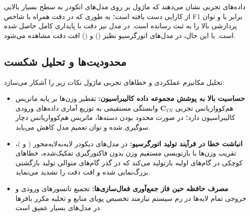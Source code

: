 داده‌های تجربی نشان می‌دهند که ماژول بر روی مدل‌های انکودر به سطح بسیار بالایی از کارایی دست یافته است؛ به طوری که در  دقت  همراه با شاخص F1 برابر با  و توان پردازشی بالا  را به ثبت رسانده است. در مدل  نیز دقت  با پایداری کامل حاصل شده است. با این حال، در مدل‌های اتورگرسیو نظیر  () و  () افت دقت مشاهده می‌شود.

\subsection{محدودیت‌ها و تحلیل شکست}
تحلیل مکانیزم عملکردی و خطاهای تجربی ماژول نکات زیر را آشکار می‌سازد:
\begin{itemize}
    \item \textbf{حساسیت بالا به پوشش مجموعه داده کالیبراسیون:} تقطیر وزن‌ها بر پایه ماتریس هم‌کوواریانس تجربی $\mathbf{C}_{YX}$ وابستگی مستقیمی به توزیع آماری داده‌های ورودی کالیبراسیون دارد؛ در صورت محدود بودن دسته‌ها، ماتریس هم‌کوواریانس دچار سوگیری شده و توان تعمیم مدل کاهش می‌یابد.
    \item \textbf{انباشت خطا در فرآیند تولید اتورگرسیو:} در مدل‌های دیکودر لایه‌به‌لایه‌محور ( و )، تقریب وزن‌ها با بازنویسی مستقیم وزن بدون فاکتورگیری تفکیک‌شده، خطاهای کوچکی در گام‌های اولیه بازتولید می‌کند که در گذر گام‌های متوالی تولید بازگشتی بزرگ‌نمایی شده و افت دقت را تشدید می‌نماید.
    \item \textbf{مصرف حافظه حین فاز جمع‌آوری فعال‌سازی‌ها:} تجمیع تانسورهای ورودی و خروجی تمام لایه‌ها در رم سیستم نیازمند تخصیص پویای منابع و تخلیه مکرر بافرها در مدل‌های بسیار عمیق است.
\end{itemize}
